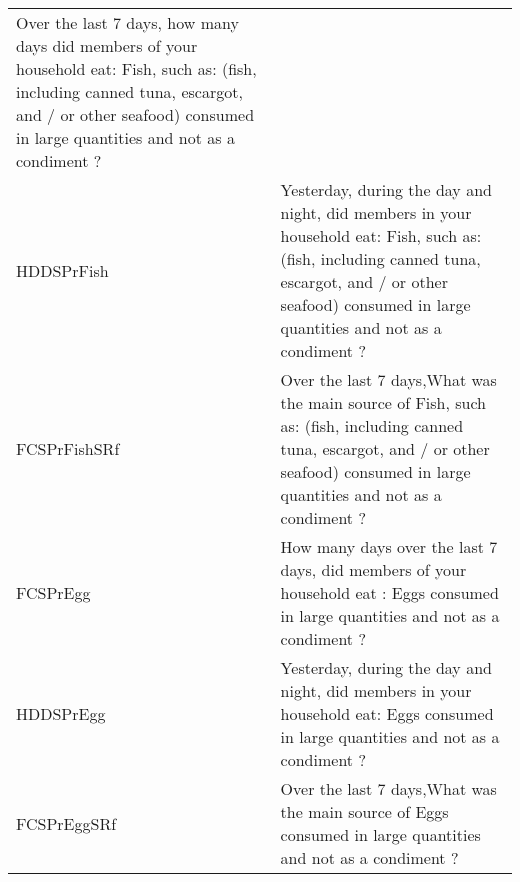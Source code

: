 \documentclass[
]{article}
\begin{document}
\begin{longtable}[]{@{}ll@{}}
\begin{minipage}[t]{0.72\columnwidth}
Over the last 7 days, how many days did members of your household eat: Fish, such as: (fish, including canned tuna, escargot, and / or other seafood) consumed in large quantities and not as a condiment ?\strut
\end{minipage}\tabularnewline
\begin{minipage}[t]{0.22\columnwidth}\raggedright
HDDSPrFish\strut
\end{minipage} & \begin{minipage}[t]{0.72\columnwidth}\raggedright
Yesterday, during the day and night, did members in your household eat: Fish, such as: (fish, including canned tuna, escargot, and / or other seafood) consumed in large quantities and not as a condiment ?\strut
\end{minipage}\tabularnewline
\begin{minipage}[t]{0.22\columnwidth}\raggedright
FCSPrFishSRf\strut
\end{minipage} & \begin{minipage}[t]{0.72\columnwidth}\raggedright
Over the last 7 days,What was the main source of Fish, such as: (fish, including canned tuna, escargot, and / or other seafood) consumed in large quantities and not as a condiment ?\strut
\end{minipage}\tabularnewline
\begin{minipage}[t]{0.22\columnwidth}\raggedright
FCSPrEgg\strut
\end{minipage} & \begin{minipage}[t]{0.72\columnwidth}\raggedright
How many days over the last 7 days, did members of your household eat : Eggs consumed in large quantities and not as a condiment ?\strut
\end{minipage}\tabularnewline
\begin{minipage}[t]{0.22\columnwidth}\raggedright
HDDSPrEgg\strut
\end{minipage} & \begin{minipage}[t]{0.72\columnwidth}\raggedright
Yesterday, during the day and night, did members in your household eat: Eggs consumed in large quantities and not as a condiment ?\strut
\end{minipage}\tabularnewline
\begin{minipage}[t]{0.22\columnwidth}\raggedright
FCSPrEggSRf\strut
\end{minipage} & \begin{minipage}[t]{0.72\columnwidth}\raggedright
Over the last 7 days,What was the main source of Eggs consumed in large quantities and not as a condiment ?\strut

\end{minipage}
\end{longtable}
\end{document}
